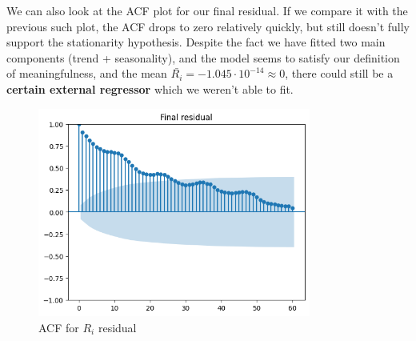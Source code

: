 \documentclass[12pt,a4paper]{article}
\begin{document}
We can also look at the ACF plot for our final residual. If we compare it with the previous such plot, the ACF drops to zero relatively quickly, but still doesn't fully support the stationarity hypothesis. Despite the fact we have fitted two main components (trend + seasonality), and the model seems to satisfy our definition of meaningfulness, and the mean $\bar{R_i} = -1.045 \cdot 10^{-14} \approx 0$, there could still be a \textbf{certain external regressor} which we weren't able to fit. 

\begin{figure}[h!]
	\centering
	\includegraphics[width=0.8\textwidth]{figures/final_acf.png}
	\caption{ACF for $R_i$ residual}
\end{figure}
\end{document}
